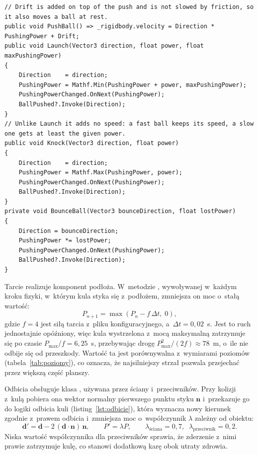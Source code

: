 \begin{lstlisting}[caption={Operacje zmiany stanu ruchu w~klasie AbstractBallMovementLogic; \zrodloWlasne},label=lst:ruch]
// Drift is added on top of the push and is not slowed by friction, so it also moves a ball at rest.
public void PushBall() => _rigidbody.velocity = Direction * PushingPower + Drift;
public void Launch(Vector3 direction, float power, float maxPushingPower)
{
    Direction    = direction;
    PushingPower = Mathf.Min(PushingPower + power, maxPushingPower);
    PushingPowerChanged.OnNext(PushingPower);
    BallPushed?.Invoke(Direction);
}
// Unlike Launch it adds no speed: a fast ball keeps its speed, a slow one gets at least the given power.
public void Knock(Vector3 direction, float power)
{
    Direction    = direction;
    PushingPower = Mathf.Max(PushingPower, power);
    PushingPowerChanged.OnNext(PushingPower);
    BallPushed?.Invoke(Direction);
}
private void BounceBall(Vector3 bounceDirection, float lostPower)
{
    Direction = bounceDirection;
    PushingPower *= lostPower;
    PushingPowerChanged.OnNext(PushingPower);
    BallPushed?.Invoke(Direction);
}
\end{lstlisting}

Tarcie realizuje komponent  podłoża. W~metodzie ,
wywoływanej w~każdym kroku fizyki, w~którym kula styka się z~podłożem, zmniejsza on moc
o~stałą wartość:
\begin{equation}
  P_{n+1} = \max\left(P_n - f\,\Delta t,\; 0\right),
  \label{eq:tarcie}
\end{equation}
gdzie $f = 4$ jest siłą tarcia z~pliku konfiguracyjnego, a~$\Delta t = 0{,}02$~s.
Jest to ruch jednostajnie opóźniony, więc kula wystrzelona z~mocą maksymalną zatrzymuje
się po czasie $P_{\max}/f = 6{,}25$~s, przebywając drogę $P_{\max}^2/(2f) \approx 78$~m,
o~ile nie odbije się od przeszkody. Wartość ta jest porównywalna z~wymiarami poziomów
(tabela~\ref{tab:poziomy}), co oznacza, że najsilniejszy strzał pozwala przejechać przez
większą część planszy.

Odbicia obsługuje klasa , używana przez ściany i~przeciwników. Przy kolizji
z~kulą pobiera ona wektor normalny pierwszego punktu styku $\mathbf{n}$ i~przekazuje go
do logiki odbicia kuli (listing~\ref{lst:odbicie}), która wyznacza nowy kierunek zgodnie
z~prawem odbicia i~zmniejsza moc o~współczynnik $\lambda$ zależny od obiektu:
\begin{equation}
  \mathbf{d}' = \mathbf{d} - 2\,(\mathbf{d}\cdot\mathbf{n})\,\mathbf{n}, \qquad
  P' = \lambda P, \qquad \lambda_{\text{ściana}} = 0{,}7,\;\; \lambda_{\text{przeciwnik}} = 0{,}2.
  \label{eq:odbicie}
\end{equation}
Niska wartość współczynnika dla przeciwników sprawia, że zderzenie z~nimi prawie zatrzymuje
kulę, co stanowi dodatkową karę obok utraty zdrowia.

